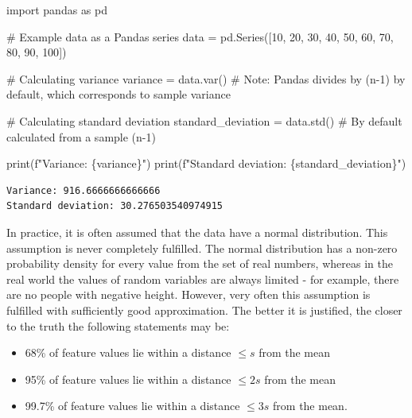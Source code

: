 \documentclass[
  english,
  letterpaper,
  DIV=11,
  numbers=noendperiod]{scrreprt}
\newenvironment{Shaded}{\begin{snugshade}}{\end{snugshade}}
\newcommand{\BuiltInTok}[1]{\textcolor[rgb]{0.00,0.23,0.31}{#1}}
\newcommand{\CommentTok}[1]{\textcolor[rgb]{0.37,0.37,0.37}{#1}}
\newcommand{\DecValTok}[1]{\textcolor[rgb]{0.68,0.00,0.00}{#1}}
\newcommand{\ImportTok}[1]{\textcolor[rgb]{0.00,0.46,0.62}{#1}}
\newcommand{\NormalTok}[1]{\textcolor[rgb]{0.00,0.23,0.31}{#1}}
\newcommand{\OperatorTok}[1]{\textcolor[rgb]{0.37,0.37,0.37}{#1}}
\newcommand{\SpecialCharTok}[1]{\textcolor[rgb]{0.37,0.37,0.37}{#1}}
\newcommand{\SpecialStringTok}[1]{\textcolor[rgb]{0.13,0.47,0.30}{#1}}
\providecommand{\tightlist}{%
  \setlength{\itemsep}{0pt}\setlength{\parskip}{0pt}}
\begin{document}
\begin{Shaded}
\begin{Highlighting}[]
\ImportTok{import}\NormalTok{ pandas }\ImportTok{as}\NormalTok{ pd}

\CommentTok{\# Example data as a Pandas series}
\NormalTok{data }\OperatorTok{=}\NormalTok{ pd.Series([}\DecValTok{10}\NormalTok{, }\DecValTok{20}\NormalTok{, }\DecValTok{30}\NormalTok{, }\DecValTok{40}\NormalTok{, }\DecValTok{50}\NormalTok{, }\DecValTok{60}\NormalTok{, }\DecValTok{70}\NormalTok{, }\DecValTok{80}\NormalTok{, }\DecValTok{90}\NormalTok{, }\DecValTok{100}\NormalTok{])}

\CommentTok{\# Calculating variance}
\NormalTok{variance }\OperatorTok{=}\NormalTok{ data.var()  }\CommentTok{\# Note: Pandas divides by (n{-}1) by default, which corresponds to sample variance}

\CommentTok{\# Calculating standard deviation}
\NormalTok{standard\_deviation }\OperatorTok{=}\NormalTok{ data.std()  }\CommentTok{\# By default calculated from a sample (n{-}1)}

\BuiltInTok{print}\NormalTok{(}\SpecialStringTok{f"Variance: }\SpecialCharTok{\{}\NormalTok{variance}\SpecialCharTok{\}}\SpecialStringTok{"}\NormalTok{)}
\BuiltInTok{print}\NormalTok{(}\SpecialStringTok{f"Standard deviation: }\SpecialCharTok{\{}\NormalTok{standard\_deviation}\SpecialCharTok{\}}\SpecialStringTok{"}\NormalTok{)}
\end{Highlighting}
\end{Shaded}

\begin{verbatim}
Variance: 916.6666666666666
Standard deviation: 30.276503540974915
\end{verbatim}

In practice, it is often assumed that the data have a normal
distribution. This assumption is never completely fulfilled. The normal
distribution has a non-zero probability density for every value from the
set of real numbers, whereas in the real world the values of random
variables are always limited - for example, there are no people with
negative height. However, very often this assumption is fulfilled with
sufficiently good approximation. The better it is justified, the closer
to the truth the following statements may be:

\begin{itemize}
\tightlist
\item
  68\% of feature values lie within a distance \(\leqslant s\) from the
  mean
\item
  95\% of feature values lie within a distance \(\leqslant 2s\) from the
  mean
\item
  99.7\% of feature values lie within a distance \(\leqslant 3s\) from
  the mean.
\end{itemize}
\end{document}
